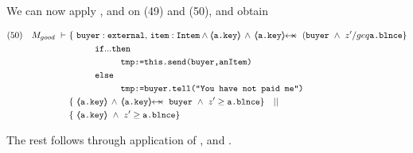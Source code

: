 \begin{proofO}
We can now apply  {\sc{[If\_Rule}}, and {\sc{[Conseq}} on (49) and (50),  and obtain

 \small
\begin{align*}
\text{(50)} \ \ \ M_{good}\  \vdash \ & \{ \ \prg{buyer}:\prg{external},\, \prg{item}:\prg{Intem} \wedge {\inside{\prg{a.key}}} \, \wedge\, 
\protectedFrom {\prg{a.key}} {(\prg{buyer}}  \  \wedge\ z'/geq  \prg{a.\balance}  \} \\
		  		& \SPT  \prg{if} ... \prg{then}\\
				& \SPT \SPT  \prg{tmp:=this.send(buyer,anItem)}\ \\  
				& \SPT  \prg{else}\\
				& \SPT \SPT  \prg{tmp:=buyer.tell("You have not paid me")}\ \\  
		  		& \{ \ \inside{\prg{a.key}} \, \wedge\, 
\protectedFrom {\prg{a.key}} {\prg{buyer}} \ \wedge\ z'\geq \prg{a.\balance}  \} \ \ \  || \ \ \  \\
		  		&   \{ \   {\inside{\prg{a.key}}}\  \wedge\ z'\geq  \prg{a.\balance}  \}
\end{align*}
\normalsize 

The rest follows through application of {\sc{[Prot\_Int}}, and {\sc{[Seq]}}.



\end{proofO}

